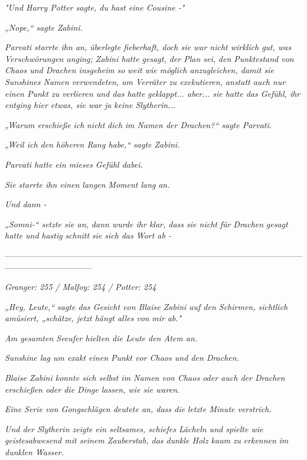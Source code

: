 {\emph{"Und Harry Potter sagte, du hast eine Cousine -"}

\emph{„Nope,“ sagte Zabini.}

\emph{Parvati starrte ihn an,} \emph{überlegte fieberhaft, doch sie war nicht wirklich gut, was Verschwörungen anging; Zabini hatte gesagt, der Plan sei,} \emph{den Punktestand von Chaos und Drachen insgeheim} \emph{so} \emph{weit wie möglich anzugleichen, damit sie Sunshines Namen verwendeten, um Verräter zu exekutieren, anstatt auch nur einen Punkt zu verlieren und das hatte} \emph{\emph{geklappt}... aber... sie hatte das Gefühl, ihr entging hier etwas, sie war} \emph{ja} \emph{keine Slytherin...}

\emph{„Warum erschieße} \emph{\emph{ich}} \emph{nicht} \emph{\emph{dich}} \emph{im Namen der Drachen?“ sagte Parvati.}

\emph{„Weil ich den höheren Rang habe,“ sagte Zabini.}

\emph{Parvati hatte ein mieses Gefühl dabei.}

\emph{Sie starrte ihn einen langen} \emph{Moment lang} \emph{an.}

\emph{Und dann -}

\emph{„\emph{Somni-}“ setzte sie an, dann wurde ihr klar, dass sie nicht} \emph{\emph{für Drachen}} \emph{gesagt hatte und} \emph{hastig} \emph{schnitt} \emph{sie sich} \emph{das Wort ab -}

--------------------------------------------------------------------------------------------------------------------------------------------

\hfill\break \emph{Granger: 255 / Malfoy: 254 / Potter: 254}

\emph{„Hey, Leute,“ sagte das Gesicht von Blaise Zabini auf den Schirmen, sichtlich amüsiert, „schätze, jetzt hängt alles} \emph{von} \emph{mir} \emph{ab."}

\emph{Am gesamten Seeufer hielten die Leute den Atem an.}

\emph{Sunshine lag um exakt einen Punkt vor Chaos und den Drachen.}

\emph{Blaise Zabini konnte sich selbst im Namen von Chaos oder auch der Drachen erschießen oder die Dinge lassen, wie sie waren.}

\emph{Eine Serie von Gongschlägen deutete an, dass die} \emph{letzte Minute verstrich.}

\emph{Und der Slytherin zeigte ein seltsames, schiefes Lächeln und spielte wie geistesabwesend mit seinem Zauberstab, das dunkle Holz kaum} \emph{zu} \emph{erkennen} \emph{im dunklen Wasser.}

}
